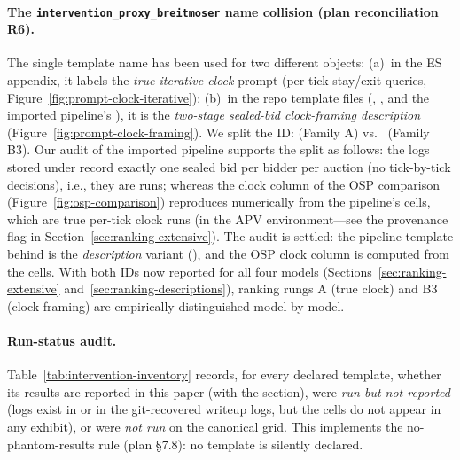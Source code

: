 \paragraph{The \texttt{intervention\_proxy\_breitmoser} name collision (plan reconciliation R6).} The single template name  has been used for two different objects: (a)~in the ES appendix, it labels the \emph{true iterative clock} prompt (per-tick stay/exit queries, Figure~\ref{fig:prompt-clock-iterative}); (b)~in the repo template files (, , and the imported pipeline's ), it is the \emph{two-stage sealed-bid clock-framing description} (Figure~\ref{fig:prompt-clock-framing}). We split the ID:  (Family A) vs.\  (Family B3). Our audit of the imported pipeline supports the split as follows: the logs stored under  record exactly one sealed bid per bidder per auction (no tick-by-tick decisions), i.e., they are  runs; whereas the clock column of the OSP comparison (Figure~\ref{fig:osp-comparison}) reproduces numerically from the pipeline's  cells, which are true per-tick clock runs (in the APV environment---see the provenance flag in Section~\ref{sec:ranking-extensive}). The audit is settled: the pipeline template behind  is the \emph{description} variant (), and the OSP clock column is computed from the  cells. With both IDs now reported for all four models (Sections~\ref{sec:ranking-extensive} and~\ref{sec:ranking-descriptions}), ranking rungs A (true clock) and B3 (clock-framing) are empirically distinguished model by model.

\paragraph{Run-status audit.} Table~\ref{tab:intervention-inventory} records, for every declared template, whether its results are reported in this paper (with the section), were \emph{run but not reported} (logs exist in  or in the git-recovered writeup logs, but the cells do not appear in any exhibit), or were \emph{not run} on the canonical grid. This implements the no-phantom-results rule (plan \S7.8): no template is silently declared.

